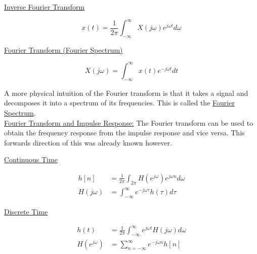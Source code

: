 \documentclass{article}
\newcommand{\gap}{\medskip\\}
\newcommand{\centertext}[1]{\begin{center}#1\end{center}}
\newcommand{\jomega}{{j\omega}}
\newcommand{\domega}{d\omega}
\begin{document}
\begin{multicols}{2}
    \centertext{\underline{Inverse Fourier Transform}}
    \[
        x(t) = \frac{1}{2\pi}\int_{-\infty}^\infty X(j\omega)e^{j\omega t}{d}\omega
    \]
    \vfill\null\columnbreak
    \centertext{\underline{Fourier Transform (Fourier Spectrum)}}
    \[
        X(\jomega) = \int_{-\infty}^\infty x(t)e^{-\jomega t}{d}t  
    \]
    \vfill\null
\end{multicols}
A more physical intuition of the Fourier transform is that it takes
a signal and decomposes it into a spectrum of its frequencies. This
is called the \underline{Fourier Spectrum}.
\gap
\underline{Fourier Transform and Impulse Response:} The Fourier
transform can be used to obtain the frequency response from the impulse response
and vice versa. This forwards direction of this was already known however.

\begin{multicols}{2}
    \centertext{\underline{Continuous Time}}
    \begin{align*}
        h[n] &= \frac{1}{2\pi}\int_{2\pi}H(e^\jomega)e^{\jomega n} \domega\\
        H(\jomega) &= \int_{-\infty}^\infty e^{-\jomega \tau}h(\tau)d\tau
    \end{align*}
    \vfill\null\columnbreak
    \centertext{\underline{Discrete Time}}
    \begin{align*}
        h(t) &= \frac{1}{2\pi}\int_{-\infty}^\infty e^{j\omega t}H(\jomega)\domega \\ 
        H(e^{\jomega}) &= \sum_{n = -\infty}^\infty e^{-\jomega n }h[n]
    \end{align*}
    \vfill\null
\end{multicols}
\end{document}
